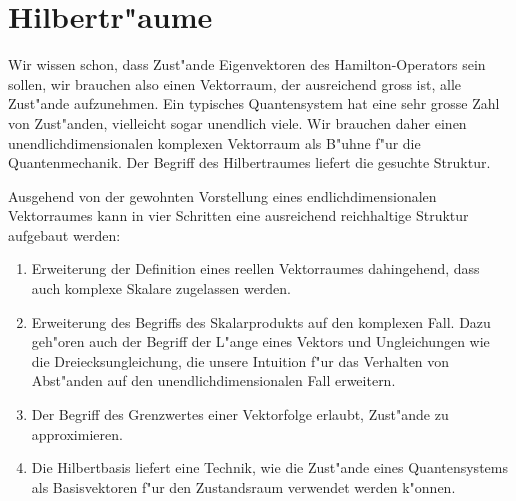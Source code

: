 \chapter{Hilbertr"aume\label{chapter:hilbertraeume}}
\rhead{}
Wir wissen schon, dass Zust"ande Eigenvektoren des Hamilton-Operators
sein sollen, wir brauchen
also einen Vektorraum, der ausreichend gross ist, alle Zust"ande aufzunehmen.
Ein typisches Quantensystem hat eine sehr grosse Zahl von Zust"anden,
vielleicht sogar unendlich viele.
Wir brauchen daher einen unendlichdimensionalen komplexen Vektorraum als
B"uhne f"ur die Quantenmechanik.
Der Begriff des Hilbertraumes liefert die gesuchte Struktur.

Ausgehend von der gewohnten Vorstellung eines endlichdimensionalen
Vektorraumes kann in vier Schritten eine ausreichend reichhaltige
Struktur aufgebaut werden:
\begin{enumerate}
\item Erweiterung der Definition eines reellen Vektorraumes dahingehend,
dass auch komplexe Skalare zugelassen werden.
\item Erweiterung des Begriffs des Skalarprodukts auf den komplexen Fall.
Dazu geh"oren auch der Begriff der L"ange eines Vektors und Ungleichungen
wie die Dreiecksungleichung, die unsere Intuition f"ur das Verhalten von
Abst"anden auf den unendlichdimensionalen Fall erweitern.
\item Der Begriff des Grenzwertes einer Vektorfolge erlaubt, Zust"ande
zu approximieren.
\item Die Hilbertbasis liefert eine Technik, wie die Zust"ande eines
Quantensystems als Basisvektoren f"ur den Zustandsraum verwendet werden
k"onnen.
\end{enumerate}

